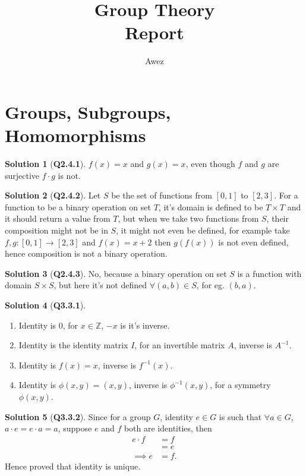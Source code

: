 \documentclass{article}
\title{\textbf{Group Theory} \\ Report}
\author{Awez}
\date{}
\theoremstyle{definition}
\newtheorem*{sol}{Solution}
\begin{document}
\maketitle

\section{Groups, Subgroups, Homomorphisms}
\begin{sol}[\textbf{Q2.4.1}]
	$f(x)=x$ and $g(x)=x$, even though $f$ and $g$ are surjective $f\cdot g$ is not.
\end{sol}

\begin{sol}[\textbf{Q2.4.2}]
	Let $S$ be the set of functions from $[0, 1]$ to $[ 2,3 ]$. For a function to be a binary operation on set $T$, it's domain is defined to be $T \times T$ and it should return a value from $T$, but when we take two functions from $S$, their composition might not be in $S$, it might not even be defined, for example take $f,g: [0,1] \rightarrow [2,3]$ and $f(x) = x+2$ then $g(f(x))$ is not even defined, hence composition is not a binary operation.
\end{sol}

\begin{sol}[\textbf{Q2.4.3}]
	No, because a binary operation on set $S$ is a function with domain $S\times S$, but here  it's not defined $\forall (a,b) \in S$, for eg. $(b,a)$.
\end{sol}

\begin{sol}[\textbf{Q3.3.1}]
	\begin{enumerate}
		\item Identity is $0$, for $x \in \mathbb{Z}$, $-x$ is it's inverse.
		\item Identity is the identity matrix $I$, for an invertible matrix $A$, inverse is $A^{-1}$.
		\item Identity is $f(x)=x$, inverse is $f^{-1}(x)$.
		\item Identity is $\phi(x,y)=(x,y)$, inverse is $\phi^{-1}(x,y)$, for a symmetry $\phi(x,y)$.
	\end{enumerate}
\end{sol}

\begin{sol}[\textbf{Q3.3.2}]
	Since for a group $G$, identity $e\in G$ is such that $\forall a \in G$, $a\cdot e = e\cdot a = a$, suppose $e$ and $f$ both are identities, then
	\begin{align}
		e\cdot f   & = f \\
		           & = e \\
		\implies e & =f.
	\end{align}
	Hence proved that identity is unique.
\end{sol}
\end{document}

